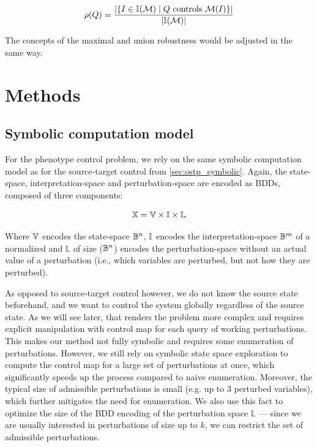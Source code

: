 $$
\rho(Q) = \frac{|\{I \in \mathbb{I}(\mathcal{M}) \mid Q \text{ controls } \mathcal{M}(I)\}|}{|\mathbb{I}(\mathcal{M})|}
$$

The concepts of the maximal and union robustness would be adjusted in the same way.

\section{Methods}
\label{sec:phen_control_method}

\subsection{Symbolic computation model}

For the phenotype control problem, we rely on the same symbolic computation model as for the source-target control from \autoref{sec:ostp_symbolic}. Again, the state-space, interpretation-space and perturbation-space are encoded as BDDs, composed of three components: 

$$\mathbb{X} = \mathbb{V} \times \mathbb{I} \times \mathbb{L}$$

Where $\mathbb{V}$ encodes the state-space $\mathbb{B}^n$, $\mathbb{I}$ encodes the interpretation-space $\mathbb{B}^m$ of a normalized \PBN{} and $\mathbb{L}$ of size ($\mathbb{B}^n$) encodes the perturbation-space without an actual value of a perturbation (i.e., which variables are perturbed, but not how they are perturbed).

As opposed to source-target control however, we do not know the source state beforehand, and we want to control the system globally regardless of the source state. As we will see later, that renders the problem more complex and requires explicit manipulation with control map for each query of working perturbations. This makes our method not fully symbolic and requires some enumeration of perturbations. However, we still rely on symbolic state space exploration to compute the control map for a large set of perturbations at once, which significantly speeds up the process compared to naive enumeration. Moreover, the typical size of admissible perturbations is small (e.g. up to 3 perturbed variables), which further mitigates the need for enumeration. We also use this fact to optimize the size of the BDD encoding of the perturbation space $\mathbb{L}$ --- since we are usually interested in perturbations of size up to $k$, we can restrict the set of admissible perturbations.


